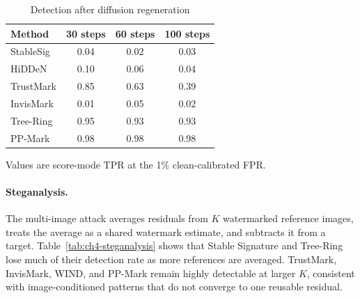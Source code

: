 \begin{table}[H]
    \centering
    \caption{Detection after diffusion regeneration}
    \label{tab:ch4-regeneration}
    \small
    \setlength{\tabcolsep}{8pt}
    \renewcommand{\arraystretch}{1.13}
    \begin{tabular}{@{}lccc@{}}
        \toprule
        Method & 30 steps & 60 steps & 100 steps \\
        \midrule
        StableSig  & 0.04 & 0.02 & 0.03 \\
        HiDDeN     & 0.10 & 0.06 & 0.04 \\
        TrustMark  & 0.85 & 0.63 & 0.39 \\
        InvisMark  & 0.01 & 0.05 & 0.02 \\
        Tree-Ring  & 0.95 & 0.93 & 0.93 \\
        PP-Mark    & 0.98 & 0.98 & 0.98 \\
        \bottomrule
    \end{tabular}

    \vspace{2pt}
    \parbox{0.92\textwidth}{\footnotesize
    Values are score-mode TPR at the 1\% clean-calibrated FPR.}
\end{table}

\paragraph{Steganalysis.}
The multi-image attack averages residuals from $K$ watermarked reference
images, treats the average as a shared watermark estimate, and subtracts it from a
target.  Table~\ref{tab:ch4-steganalysis} shows that Stable Signature and Tree-Ring
lose much of their detection rate as more references are averaged.  TrustMark,
InvisMark, WIND, and PP-Mark remain highly detectable at larger $K$, consistent
with image-conditioned patterns that do not converge to one reusable residual.

